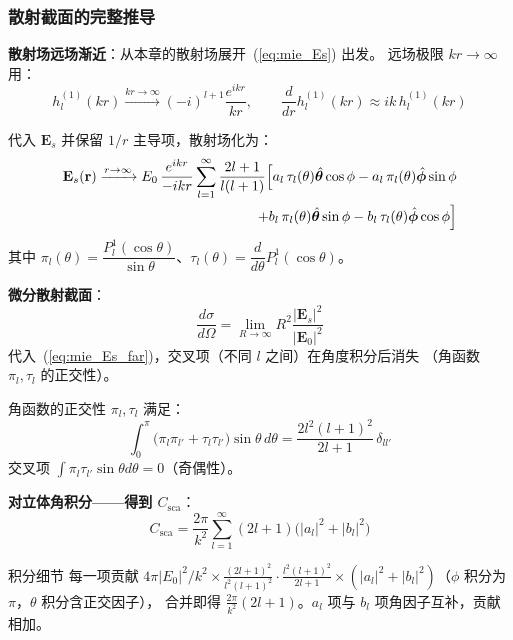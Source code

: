 \subsubsection{散射截面的完整推导}

\textbf{散射场远场渐近}：从本章的散射场展开~(\ref{eq:mie_Es}) 出发。
远场极限 $kr\to\infty$ 用：
\begin{equation}
  h_l^{(1)}(kr) \xrightarrow{kr\to\infty} (-i)^{l+1}\frac{e^{ikr}}{kr},\qquad
  \frac{d}{dr}h_l^{(1)}(kr) \approx ik\,h_l^{(1)}(kr)
\end{equation}

代入 $\mathbf{E}_s$ 并保留 $1/r$ 主导项，散射场化为：
\begin{align}
  \mathbf{E}_s(\mathbf{r}) \xrightarrow{r\to\infty}
  E_0\,\frac{e^{ikr}}{-ikr}\sum_{l=1}^\infty
  \frac{2l+1}{l(l+1)}\Bigl[
    a_l\,\tau_l(\theta)\hat{\boldsymbol{\theta}}\cos\phi
    - a_l\,\pi_l(\theta)\hat{\boldsymbol{\phi}}\sin\phi \notag\\
    + b_l\,\pi_l(\theta)\hat{\boldsymbol{\theta}}\sin\phi
    - b_l\,\tau_l(\theta)\hat{\boldsymbol{\phi}}\cos\phi
  \Bigr]
  \label{eq:mie_Es_far}
\end{align}
其中 $\pi_l(\theta) = \dfrac{P_l^1(\cos\theta)}{\sin\theta}$、$\tau_l(\theta) = \dfrac{d}{d\theta}P_l^1(\cos\theta)$。

\textbf{微分散射截面}：
\begin{equation}
  \frac{d\sigma}{d\Omega} = \lim_{R\to\infty}R^2\frac{|\mathbf{E}_s|^2}{|\mathbf{E}_0|^2}
\end{equation}
代入~(\ref{eq:mie_Es_far})，交叉项（不同 $l$ 之间）在角度积分后消失
（角函数 $\pi_l,\tau_l$ 的正交性）。

\begin{stepbox}{角函数的正交性}
$\pi_l,\tau_l$ 满足：
\begin{equation}
  \int_0^\pi\bigl(\pi_l\pi_{l'} + \tau_l\tau_{l'}\bigr)\sin\theta\,d\theta
  = \frac{2l^2(l+1)^2}{2l+1}\,\delta_{ll'}
\end{equation}
交叉项 $\int\pi_l\tau_{l'}\sin\theta d\theta = 0$（奇偶性）。
\end{stepbox}

\textbf{对立体角积分——得到 $C_{\text{sca}}$}：
\begin{equation}
  C_{\text{sca}} = \frac{2\pi}{k^2}\sum_{l=1}^{\infty}(2l+1)\bigl(|a_l|^2 + |b_l|^2\bigr)
  \label{eq:Csca_mie}
\end{equation}

\begin{stepbox}{积分细节}
每一项贡献 $4\pi|E_0|^2/k^2 \times \frac{(2l+1)^2}{l^2(l+1)^2}\cdot\frac{l^2(l+1)^2}{2l+1}
\times(|a_l|^2+|b_l|^2)$（$\phi$ 积分为 $\pi$，$\theta$ 积分含正交因子），
合并即得 $\frac{2\pi}{k^2}(2l+1)$。$a_l$ 项与 $b_l$ 项角因子互补，贡献相加。
\end{stepbox}

